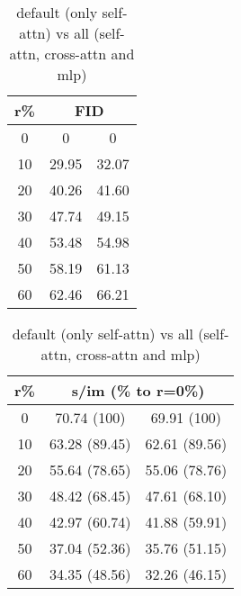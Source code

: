\begin{table}[htp]
\caption{default (only self-attn) vs all (self-attn, cross-attn and mlp)}
\label{table:exp_1_1}
    \begin{minipage}{0.48\textwidth}
        \centering
        \begin{tabular}{|c||c|c|}
            \hline
            \multicolumn{1}{|c||}{r\%} & \multicolumn{2}{c|}{FID}\\
            \hline
            0 & 0 & 0 \\
            10 & 29.95 & 32.07 \\
            20 & 40.26 & 41.60 \\
            30 & 47.74 & 49.15 \\
            40 & 53.48 & 54.98 \\
            50 & 58.19 & 61.13 \\
            60 & 62.46 & 66.21 \\
            \hline
        \end{tabular}
    \end{minipage}
    \hfill
    \begin{minipage}{0.48\textwidth}
        \centering
        \begin{tabular}{|c||c|c|}
            \hline
            \multicolumn{1}{|c||}{r\%} & \multicolumn{2}{c|}{s/im (\% to r=0\%)}\\
            \hline
            0 & 70.74 (100) & 69.91 (100) \\
            10 & 63.28 (89.45) & 62.61 (89.56) \\
            20 & 55.64 (78.65) & 55.06 (78.76) \\
            30 & 48.42 (68.45) & 47.61 (68.10) \\
            40 & 42.97 (60.74) & 41.88 (59.91) \\
            50 & 37.04 (52.36) & 35.76 (51.15) \\
            60 & 34.35 (48.56) & 32.26 (46.15) \\
            \hline
        \end{tabular}
    \end{minipage}
\end{table}